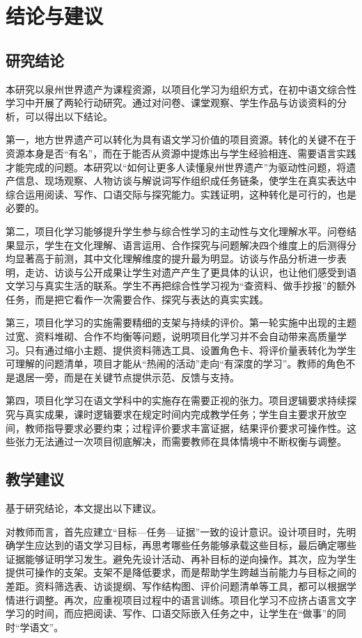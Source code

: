 \chapter{结论与建议}

\section{研究结论}

本研究以泉州世界遗产为课程资源，以项目化学习为组织方式，在初中语文综合性学习中开展了两轮行动研究。通过对问卷、课堂观察、学生作品与访谈资料的分析，可以得出以下结论。

第一，地方世界遗产可以转化为具有语文学习价值的项目资源。转化的关键不在于资源本身是否“有名”，而在于能否从资源中提炼出与学生经验相连、需要语言实践才能完成的问题。本研究以“如何让更多人读懂泉州世界遗产”为驱动性问题，将遗产信息、现场观察、人物访谈与解说词写作组织成任务链条，使学生在真实表达中综合运用阅读、写作、口语交际与探究能力。实践证明，这种转化是可行的，也是必要的。

第二，项目化学习能够提升学生参与综合性学习的主动性与文化理解水平。问卷结果显示，学生在文化理解、语言运用、合作探究与问题解决四个维度上的后测得分均显著高于前测，其中文化理解维度的提升最为明显。访谈与作品分析进一步表明，走访、访谈与公开成果让学生对遗产产生了更具体的认识，也让他们感受到语文学习与真实生活的联系。学生不再把综合性学习视为“查资料、做手抄报”的额外任务，而是把它看作一次需要合作、探究与表达的真实实践。

第三，项目化学习的实施需要精细的支架与持续的评价。第一轮实施中出现的主题过宽、资料堆砌、合作不均衡等问题，说明项目化学习并不会自动带来高质量学习。只有通过缩小主题、提供资料筛选工具、设置角色卡、将评价量表转化为学生可理解的问题清单，项目才能从“热闹的活动”走向“有深度的学习”。教师的角色不是退居一旁，而是在关键节点提供示范、反馈与支持。

第四，项目化学习在语文学科中的实施存在需要正视的张力。项目逻辑要求持续探究与真实成果，课时逻辑要求在规定时间内完成教学任务；学生自主要求开放空间，教师指导要求必要约束；过程评价要求丰富证据，结果评价要求可操作性。这些张力无法通过一次项目彻底解决，而需要教师在具体情境中不断权衡与调整。

\section{教学建议}

基于研究结论，本文提出以下建议。

对教师而言，首先应建立“目标—任务—证据”一致的设计意识。设计项目时，先明确学生应达到的语文学习目标，再思考哪些任务能够承载这些目标，最后确定哪些证据能够证明学习发生。避免先设计活动、再补目标的逆向操作。其次，应为学生提供可操作的支架。支架不是降低要求，而是帮助学生跨越当前能力与目标之间的差距。资料筛选表、访谈提纲、写作结构图、评价问题清单等工具，都可以根据学情进行调整。再次，应重视项目过程中的语言训练。项目化学习不应挤占语言文字学习的时间，而应把阅读、写作、口语交际嵌入任务之中，让学生在“做事”的同时“学语文”。

